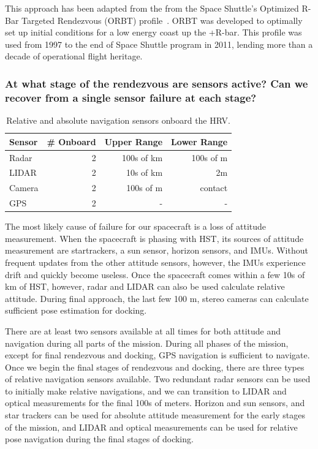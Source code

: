 \documentclass[paper=letter, fontsize=11pt]{scrartcl} %
\numberwithin{equation}{section} %
\numberwithin{figure}{section} %
\numberwithin{table}{section} %
\begin{document}
This approach has been adapted from the from the Space Shuttle's Optimized R-Bar Targeted Rendezvous (ORBT) profile~\cite{goodman2006history}. ORBT was developed to optimally set up initial conditions for a low energy coast up the +R-bar. This profile was used from 1997 to the end of Space Shuttle program in 2011, lending more than a decade of operational flight heritage.

\subsubsection{At what stage of the rendezvous are sensors active? Can we recover from a single sensor failure at each stage?}
\begin{table}[H]
\begin{center}
\begin{tabular}{l r r r}
\toprule
Sensor & \# Onboard & Upper Range & Lower Range \\
\midrule
Radar        & 2 & 100s of km & 100s of m  \\
LIDAR        & 2 & 10s of km & 2m  \\
Camera       & 2 & 100s of m & contact  \\
GPS          & 2 & - & -  \\
\bottomrule
\end{tabular}
\end{center}
\caption{Relative and absolute navigation sensors onboard the HRV.}
\end{table}

The most likely cause of failure for our spacecraft is a loss of attitude measurement. When the spacecraft is phasing with HST, its sources of attitude measurement are startrackers, a sun sensor, horizon sensors, and IMUs. Without frequent updates from the other attitude sensors, however, the IMUs experience drift and quickly become useless. Once the spacecraft comes within a few 10s of km of HST, however, radar and LIDAR can also be used calculate relative attitude. During final approach, the last few 100 m, stereo cameras can calculate sufficient pose estimation for docking.

There are at least two sensors available at all times for both attitude and navigation during all parts of the mission. During all phases of the mission, except for final rendezvous and docking, GPS navigation is sufficient to navigate. Once we begin the final stages of rendezvous and docking, there are three types of relative navigation sensors available. Two redundant radar sensors can be used to initially make relative navigations, and we can transition to LIDAR and optical measurements for the final 100s of meters. Horizon and sun sensors, and star trackers can be used for absolute attitude measurement for the early stages of the mission, and LIDAR and optical measurements can be used for relative pose navigation during the final stages of docking.
\end{document}
